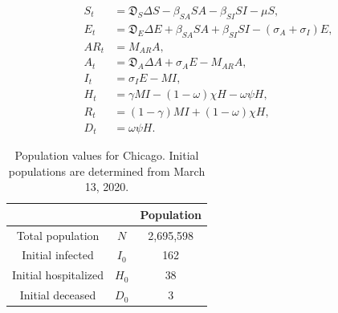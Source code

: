 \documentclass[11pt]{article}
\newcommand{\D}{\mathfrak{D}}
\begin{document}
	\begin{align}
		S_t &=	\D_S \Delta S - \beta_{SA} S A - \beta_{SI} S I - \mu S, \\
		E_t	&=	\D_E \Delta E + \beta_{SA} S A + \beta_{SI} S I - (\sigma_A + \sigma_I) E, \\
		AR_t &= M_{AR} A, \\
		A_t	&=	\D_A \Delta A + \sigma_A E - M_{AR} A, \\
		I_t	&=	\sigma_I E - M I, \\
		H_t	&=	\gamma M I - (1 - \omega) \chi H - \omega \psi H, \\
		R_t	&=	(1 - \gamma) M I + (1 - \omega) \chi H, \\
		D_t	&=	\omega \psi H.
	\end{align}
	
	\begin{table}[h]
		\centering
		\caption{Population values for Chicago.
			Initial populations are determined from March 13, 2020.}
		\label{tab:populations}
		\begin{tabular}{ c c c }
			\hline
			\hline
			&	&	Population \\
			\hline
			Total population		&	$N$		&	2,695,598 \\
			Initial infected		&	$I_0$	&	162	\\
			Initial hospitalized	&	$H_0$	&	38 \\
			Initial deceased		&	$D_0$	&	3 \\
			\hline
			\hline
		\end{tabular}
	\end{table}
	
\end{document}
